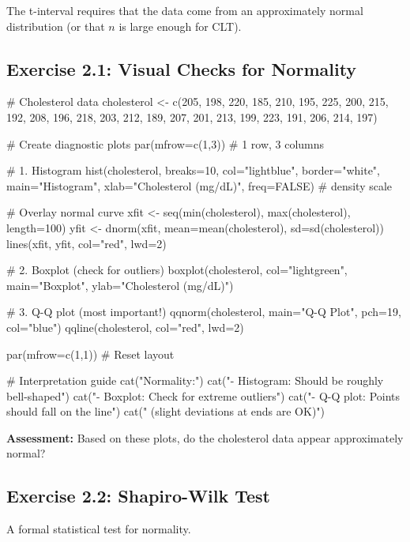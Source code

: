 \documentclass[11pt]{article}
\begin{document}
The t-interval requires that the data come from an approximately normal distribution (or that $n$ is large enough for CLT).

\subsection{Exercise 2.1: Visual Checks for Normality}

\begin{rcode}
# Cholesterol data
cholesterol <- c(205, 198, 220, 185, 210, 195, 225, 200, 215, 192,
                 208, 196, 218, 203, 212, 189, 207, 201, 213, 199,
                 223, 191, 206, 214, 197)

# Create diagnostic plots
par(mfrow=c(1,3))  # 1 row, 3 columns

# 1. Histogram
hist(cholesterol, breaks=10, col="lightblue", border="white",
     main="Histogram", xlab="Cholesterol (mg/dL)",
     freq=FALSE)  # density scale

# Overlay normal curve
xfit <- seq(min(cholesterol), max(cholesterol), length=100)
yfit <- dnorm(xfit, mean=mean(cholesterol), sd=sd(cholesterol))
lines(xfit, yfit, col="red", lwd=2)

# 2. Boxplot (check for outliers)
boxplot(cholesterol, col="lightgreen",
        main="Boxplot", ylab="Cholesterol (mg/dL)")

# 3. Q-Q plot (most important!)
qqnorm(cholesterol, main="Q-Q Plot", pch=19, col="blue")
qqline(cholesterol, col="red", lwd=2)

par(mfrow=c(1,1))  # Reset layout

# Interpretation guide
cat("\nAssessing Normality:\n")
cat("- Histogram: Should be roughly bell-shaped\n")
cat("- Boxplot: Check for extreme outliers\n")
cat("- Q-Q plot: Points should fall on the line\n")
cat("  (slight deviations at ends are OK)\n")
\end{rcode}

\textbf{Assessment:} Based on these plots, do the cholesterol data appear approximately normal?

\vspace{2cm}

\subsection{Exercise 2.2: Shapiro-Wilk Test}

A formal statistical test for normality.

\end{document}
